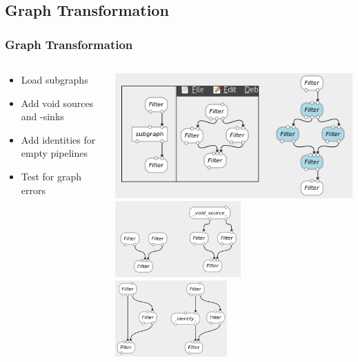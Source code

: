 \documentclass{beamer}
\begin{document}
\subsection{Graph Transformation}
\begin{frame}
\frametitle{Graph Transformation}
	\begin{columns}[c]
		\begin{column}{0.48\textwidth}
			\begin{itemize}
				\item Load subgraphs
				\item Add void sources and -sinks
				\item Add identities for empty pipelines
				\item Test for graph errors %
			\end{itemize}
		\end{column}
		\hfill
		\begin{column}{0.48\textwidth}
			\includegraphics[width=1.035\textwidth]{subgraph_before_after}\\
			\vspace{1.1mm}
			\includegraphics[width=0.53\textwidth]{voidend_before_after} ~
			\includegraphics[width=0.47\textwidth]{identity_before_after}
		\end{column}
	\end{columns}
\end{frame}
\end{document}
